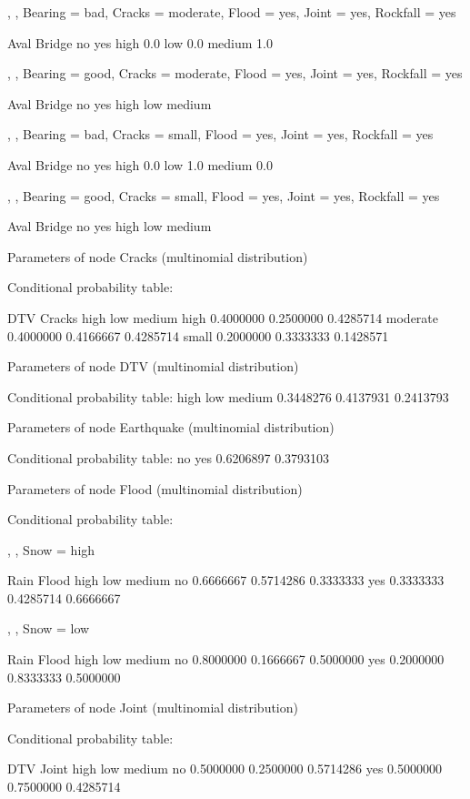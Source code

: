 , , Bearing = bad, Cracks = moderate, Flood = yes, Joint = yes, Rockfall = yes

        Aval
Bridge   no yes
  high      0.0
  low       0.0
  medium    1.0

, , Bearing = good, Cracks = moderate, Flood = yes, Joint = yes, Rockfall = yes

        Aval
Bridge   no yes
  high         
  low          
  medium       

, , Bearing = bad, Cracks = small, Flood = yes, Joint = yes, Rockfall = yes

        Aval
Bridge    no yes
  high   0.0    
  low    1.0    
  medium 0.0    

, , Bearing = good, Cracks = small, Flood = yes, Joint = yes, Rockfall = yes

        Aval
Bridge   no yes
  high         
  low          
  medium       


  Parameters of node Cracks (multinomial distribution)

Conditional probability table:
 
          DTV
Cracks          high       low    medium
  high     0.4000000 0.2500000 0.4285714
  moderate 0.4000000 0.4166667 0.4285714
  small    0.2000000 0.3333333 0.1428571

  Parameters of node DTV (multinomial distribution)

Conditional probability table:
      high       low    medium 
0.3448276 0.4137931 0.2413793 

  Parameters of node Earthquake (multinomial distribution)

Conditional probability table:
        no       yes 
0.6206897 0.3793103 

  Parameters of node Flood (multinomial distribution)

Conditional probability table:
 
, , Snow = high

     Rain
Flood      high       low    medium
  no  0.6666667 0.5714286 0.3333333
  yes 0.3333333 0.4285714 0.6666667

, , Snow = low

     Rain
Flood      high       low    medium
  no  0.8000000 0.1666667 0.5000000
  yes 0.2000000 0.8333333 0.5000000


  Parameters of node Joint (multinomial distribution)

Conditional probability table:
 
     DTV
Joint      high       low    medium
  no  0.5000000 0.2500000 0.5714286
  yes 0.5000000 0.7500000 0.4285714

